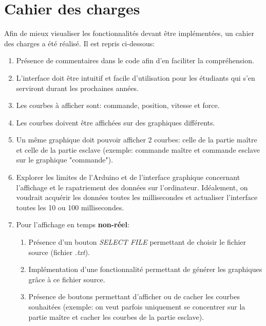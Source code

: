 \newpage
\section{Cahier des charges}

Afin de mieux visualiser les fonctionnalités devant être implémentées, un cahier des charges a été réalisé. Il est repris ci-dessous:

\begin{enumerate}
    \item Présence de commentaires dans le code afin d'en faciliter la compréhension.
    \item L'interface doit être intuitif et facile d'utilisation pour les étudiants qui s'en serviront durant les prochaines années.
    \item Les courbes à afficher sont: commande, position, vitesse et force.
    \item Les courbes doivent être affichées sur des graphiques différents.
    \item Un même graphique doit pouvoir afficher 2 courbes: celle de la partie maître et celle de la partie esclave (exemple: commande maître et commande esclave sur le graphique "commande").

     
    \item Explorer les limites de l'Arduino et de l'interface graphique concernant l'affichage et le rapatriement des données sur l'ordinateur. Idéalement, on voudrait acquérir les données toutes les millisecondes et actualiser l'interface toutes les 10 ou 100 millisecondes.
    
    \item Pour l'affichage en temps \textbf{non-réel}:
    \begin{enumerate}
        \item Présence d'un bouton \textit{SELECT FILE} permettant de choisir le fichier source (fichier \textit{.txt}).
        \item Implémentation d'une fonctionnalité permettant de générer les graphiques grâce à ce fichier source.
        \item Présence de boutons permettant d'afficher ou de cacher les courbes souhaitées (exemple: on veut parfois uniquement se concentrer sur la partie maître et cacher les courbes de la partie esclave).
    \end{enumerate}
    

\end{enumerate}
